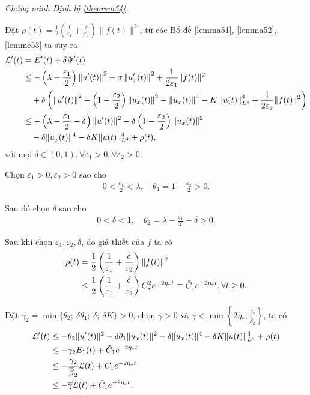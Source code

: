 \documentclass[12pt,a4paper]{article}
\theoremstyle{definition}
\theoremstyle{definition}
\begin{document}
\textit{Chứng minh Định lý \ref{theorem54}.}

Đặt $\displaystyle \rho(t) = \frac{1}{2}\left(\frac{1}{\varepsilon_1} + \frac{\delta}{\varepsilon_2}\right) \|f(t)\|^2$, từ các Bổ đề \ref{lemma51}, \ref{lemma52}, \ref{lemme53} ta suy ra
\begin{align}
    \mathcal{L}'(t) &= E'(t) + \delta \Psi'(t) \\
    &\le -\left(\lambda - \frac{\varepsilon_1}{2}\right) \left\|u'(t)\right\|^2 - \sigma \left\|u'_x(t)\right\|^2 + \frac{1}{2\varepsilon_1}\|f(t)\|^2 \notag \\
    &\quad + \delta \left(\left\|u'(t)\right\|^2 - \left(1 - \frac{\varepsilon_2}{2}\right)\left\|u_x(t)\right\|^2 - \left\|u_x(t)\right\|^4 - K \left\|u(t)\right\|^4_{L^4} + \frac{1}{2\varepsilon_2}\|f(t)\|^2\right) \notag \\
    &\le -\left(\lambda - \frac{\varepsilon_1}{2} - \delta\right)\|u'(t)\|^2 - \delta\left(1 - \frac{\varepsilon_2}{2}\right)\|u_x(t)\|^2 \notag \\
    &\quad - \delta \|u_x(t)\|^4 - \delta K \|u(t)\|^4_{L^4} + \rho(t), \notag
\end{align}
với mọi $\delta \in (0,1), \forall \varepsilon_1 > 0, \forall \varepsilon_2 > 0$.

Chọn $\varepsilon_1 > 0, \varepsilon_2 > 0$ sao cho
\begin{align}
    0 < \frac{\varepsilon_1}{2} < \lambda, \quad \theta_1 = 1 - \frac{\varepsilon_2}{2} > 0.
\end{align}

Sau đó chọn $\delta$ sao cho
\begin{align}
    0 < \delta < 1, \quad
    \theta_2 = \lambda - \frac{\varepsilon_1}{2} - \delta > 0.
\end{align}

Sau khi chọn $\varepsilon_1, \varepsilon_2, \delta$, do giả thiết của $f$ ta có
\begin{align}
    \rho(t) &= \frac{1}{2}\left(\frac{1}{\varepsilon_1} + \frac{\delta}{\varepsilon_2}\right) \|f(t)\|^2 \\
    &\le \frac{1}{2}\left(\frac{1}{\varepsilon_1} + \frac{\delta}{\varepsilon_2}\right) C_*^2 e^{-2\eta_* t} \equiv \tilde{C}_1 e^{-2\eta_* t}, \forall t \ge 0. \notag
\end{align}

Đặt $\gamma_2 = \min\{\theta_2;\: \delta\theta_1;\: \delta;\: \delta K\} > 0$, chọn $\overline{\gamma} > 0$ và $\displaystyle \overline{\gamma} < \min \left\{2\eta_*; \frac{\gamma_2}{\overline{\beta}_2}\right\}$, ta có
\begin{align}
    \mathcal{L}'(t) &\le -\theta_2 \|u'(t)\|^2 - \delta\theta_1 \|u_x(t)\|^2 - \delta \|u_x(t)\|^4 - \delta K \|u(t)\|^4_{L^4} + \rho(t) \\
    &\le -\gamma_2 E_1(t) + \tilde{C}_1 e^{-2\eta_* t} \notag \\
    &\le -\frac{\gamma_2}{\overline{\beta}_2} \mathcal{L}(t) + \tilde{C}_1 e^{-2\eta_* t} \notag \\
    &\le -\overline{\gamma} \mathcal{L}(t) + \tilde{C}_1 e^{-2\eta_* t}. \notag
\end{align}
\end{document}
